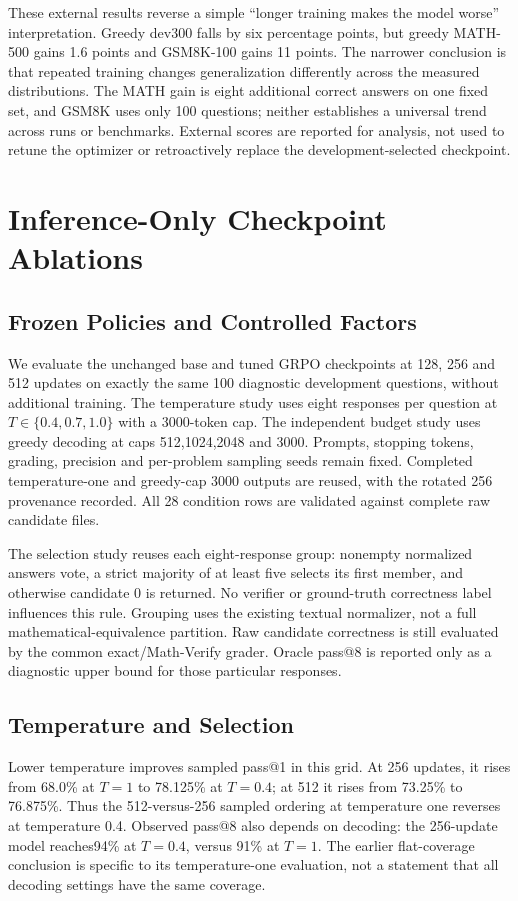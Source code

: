\documentclass[conference]{IEEEtran}
\begin{document}
These external results reverse a simple ``longer training makes the model worse'' interpretation. Greedy dev300 falls by six percentage points, but greedy MATH-500 gains 1.6 points and GSM8K-100 gains 11 points. The narrower conclusion is that repeated training changes generalization differently across the measured distributions. The MATH gain is eight additional correct answers on one fixed set, and GSM8K uses only 100 questions; neither establishes a universal trend across runs or benchmarks. External scores are reported for analysis, not used to retune the optimizer or retroactively replace the development-selected checkpoint.

\section{Inference-Only Checkpoint Ablations}



\subsection{Frozen Policies and Controlled Factors}
We evaluate the unchanged base and tuned GRPO checkpoints at 128, 256 and 512 updates on exactly the same 100 diagnostic development questions, without additional training. The temperature study uses eight responses per question at $T\in\{0.4,0.7,1.0\}$ with a 3000-token cap. The independent budget study uses greedy decoding at caps 512,1024,2048 and 3000. Prompts, stopping tokens, grading, precision and per-problem sampling seeds remain fixed. Completed temperature-one and greedy-cap 3000 outputs are reused, with the rotated 256 provenance recorded. All 28 condition rows are validated against complete raw candidate files.

The selection study reuses each eight-response group: nonempty normalized answers vote, a strict majority of at least five selects its first member, and otherwise candidate 0 is returned. No verifier or ground-truth correctness label influences this rule. Grouping uses the existing textual normalizer, not a full mathematical-equivalence partition. Raw candidate correctness is still evaluated by the common exact/Math-Verify grader. Oracle pass@8 is reported only as a diagnostic upper bound for those particular responses.

\subsection{Temperature and Selection}
Lower temperature improves sampled pass@1 in this grid. At 256 updates, it rises from 68.0\% at $T=1$ to 78.125\% at $T=0.4$; at 512 it rises from 73.25\% to 76.875\%. Thus the 512-versus-256 sampled ordering at temperature one reverses at temperature 0.4. Observed pass@8 also depends on decoding: the 256-update model reaches94\% at $T=0.4$, versus 91\% at $T=1$. The earlier flat-coverage conclusion is specific to its temperature-one evaluation, not a statement that all decoding settings have the same coverage.
\end{document}
